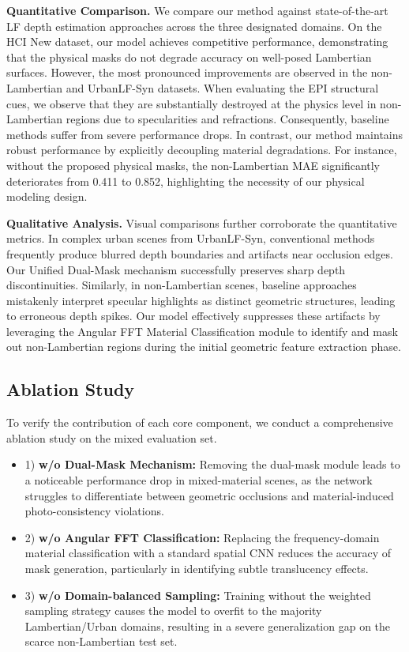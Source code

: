 \documentclass[lettersize,journal]{IEEEtran}
\begin{document}
\textbf{Quantitative Comparison.}
We compare our method against state-of-the-art LF depth estimation approaches across the three designated domains. On the HCI New dataset, our model achieves competitive performance, demonstrating that the physical masks do not degrade accuracy on well-posed Lambertian surfaces. However, the most pronounced improvements are observed in the non-Lambertian and UrbanLF-Syn datasets. When evaluating the EPI structural cues, we observe that they are substantially destroyed at the physics level in non-Lambertian regions due to specularities and refractions. Consequently, baseline methods suffer from severe performance drops. In contrast, our method maintains robust performance by explicitly decoupling material degradations. For instance, without the proposed physical masks, the non-Lambertian MAE significantly deteriorates from 0.411 to 0.852, highlighting the necessity of our physical modeling design.

\textbf{Qualitative Analysis.}
Visual comparisons further corroborate the quantitative metrics. In complex urban scenes from UrbanLF-Syn, conventional methods frequently produce blurred depth boundaries and artifacts near occlusion edges. Our Unified Dual-Mask mechanism successfully preserves sharp depth discontinuities. Similarly, in non-Lambertian scenes, baseline approaches mistakenly interpret specular highlights as distinct geometric structures, leading to erroneous depth spikes. Our model effectively suppresses these artifacts by leveraging the Angular FFT Material Classification module to identify and mask out non-Lambertian regions during the initial geometric feature extraction phase.

\subsection{Ablation Study}

To verify the contribution of each core component, we conduct a comprehensive ablation study on the mixed evaluation set. 
\begin{itemize}
\item 1) \textbf{w/o Dual-Mask Mechanism:} Removing the dual-mask module leads to a noticeable performance drop in mixed-material scenes, as the network struggles to differentiate between geometric occlusions and material-induced photo-consistency violations.
\item 2) \textbf{w/o Angular FFT Classification:} Replacing the frequency-domain material classification with a standard spatial CNN reduces the accuracy of mask generation, particularly in identifying subtle translucency effects.
\item 3) \textbf{w/o Domain-balanced Sampling:} Training without the weighted sampling strategy causes the model to overfit to the majority Lambertian/Urban domains, resulting in a severe generalization gap on the scarce non-Lambertian test set. 
\end{itemize}
\end{document}
